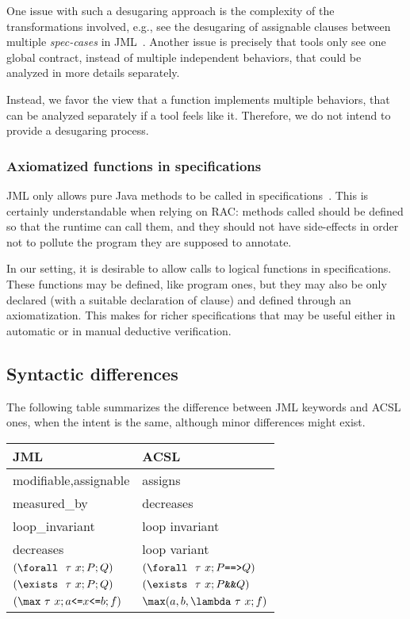 One issue with such a desugaring approach is the complexity of the
transformations involved, e.g., see the desugaring of assignable clauses
between multiple \textit{spec-cases} in
JML~\cite{raghavan00desugaring}.  Another issue is precisely that
tools only see one global contract, instead of multiple independent
behaviors, that could be analyzed in more details separately.

Instead, we favor the view that a function implements multiple
behaviors, that can be analyzed separately if a tool feels like
it. Therefore, we do not intend to provide a desugaring process.

\subsubsection*{Axiomatized functions in specifications}

JML only allows pure Java methods to be called in
specifications~\cite{leavens00preliminary}. This is certainly
understandable when relying on RAC: methods called should be defined
so that the runtime can call them, and they should not have
side-effects in order not to pollute the program they are supposed to
annotate. 

In our setting, it is desirable to allow calls to logical functions in
specifications. These functions may be defined, like program ones, but
they may also be only declared (with a suitable declaration of \reads
clause) and defined through an axiomatization. 
This makes for richer specifications that may be useful either in
automatic or in manual deductive verification.

\subsection{Syntactic differences}

The following table summarizes the difference between JML keywords and
ACSL ones, when the intent is the same, although minor differences
might exist.

\begin{center}
\begin{tabular}{|l|l|}
\hline
  JML                  & ACSL \\ \hline
  modifiable,assignable           & assigns \\
  measured\_by         & decreases \\
  loop\_invariant      & loop invariant \\
  decreases            & loop variant \\
  $(\texttt{{\textbackslash}forall}~~\tau~x ; P ; Q)$ &   $(\Forall~\tau~x ; P \verb|==>| Q)$ \\
  $(\texttt{{\textbackslash}exists}~~\tau~x ; P ; Q)$ &   $(\Exists~\tau~x ; P \verb|&&| Q)$ \\
  $(\verb|\max|~\tau~x ; a \verb|<=| x \verb|<=| b ; f)$ &   
  $\verb|\max|(a,b,\verb|\lambda|~\tau~x ; f)$ \\
  \hline
\end{tabular}
\end{center}


